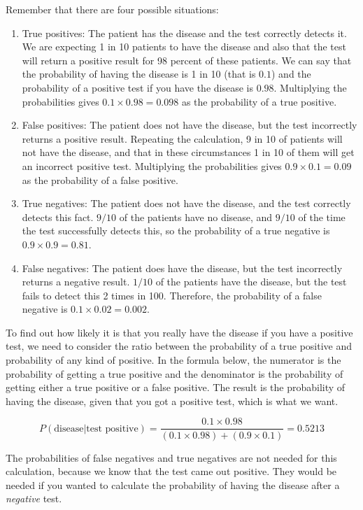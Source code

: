 Remember that there are four possible situations:
\begin{enumerate}
\item True positives: The patient has the disease and the test correctly  detects it. We are expecting 1 in 10  patients to have the disease and
         also that the test will return a positive result for 98 percent of these patients. We can say that the probability of having the disease is 1 in 10 (that is $0.1$)
	and the probability of a positive test if you have the disease is $0.98$. Multiplying the probabilities gives $0.1 \times 0.98 = 0.098$ as the probability of a true positive.
\item False positives: The patient does not have the disease, but the test incorrectly returns a positive result. Repeating the calculation, 9 in 10 of patients will not have the disease, and that in these circumstances 1 in 10 of them will get an incorrect positive test. Multiplying the probabilities gives $0.9 \times 0.1 = 0.09$ as the probability of a false positive. 
\item True negatives: The patient does not have the disease, and the test correctly detects this fact. $9/10$ of the patients have no disease, and $9/10$ of the time the test successfully detects this, so the probability of a true negative is $0.9 \times 0.9 = 0.81$.
\item False negatives: The patient does have the disease, but the test incorrectly returns a negative result.  $1/10$ of the patients have the disease, but the test fails to detect this 2 times in 100. Therefore, the probability of a false negative is $0.1 \times 0.02 = 0.002$. 
\end{enumerate}

To find out how likely it is that you really have the disease if you have a positive test, we need to consider the ratio between the probability of a  true positive and 
probability of any kind of positive. In the formula below, the numerator is the probability of getting a true positive and the denominator is the probability of getting either a true positive or a false positive.  The result is the probability of having the disease, given that you got a positive test, which is what we want.

\begin{equation}
P(\mbox{disease}|\mbox{test positive}) = \frac{0.1\times 0.98}{(0.1 \times 0.98) + (0.9 \times 0.1)} = 0.5213
\end{equation}


The probabilities of false negatives and true negatives are not needed for this calculation, because we know that the
test came out positive. They would be needed if you wanted to calculate the probability of having the disease after a \emph{negative} test.

